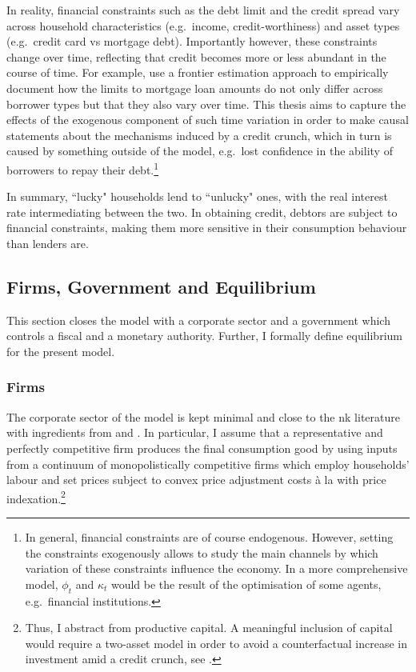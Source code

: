 \documentclass[a4paper,12pt]{article} %
\numberwithin{equation}{section} %
\numberwithin{figure}{section}
\numberwithin{table}{section}
\begin{document}
In reality, financial constraints such as the debt limit and the credit spread vary across household characteristics (e.g.~income, credit-worthiness) and asset types (e.g.~credit card vs mortgage debt). Importantly however, these constraints change over time, reflecting that credit becomes more or less abundant in the course of time. For example, \textcite{anenberg2018} use a frontier estimation approach to empirically document how the limits to mortgage loan amounts do not only differ across borrower types but that they also vary over time. This thesis aims to capture the effects of the exogenous component of such time variation in order to make causal statements about the mechanisms induced by a credit crunch, which in turn is caused by something outside of the model, e.g.~lost confidence in the ability of borrowers to repay their debt.\footnote{In general, financial constraints are of course endogenous. However, setting the constraints exogenously allows to study the main channels by which variation of these constraints influence the economy. In a more comprehensive model, $\phi_t$ and $\kappa_t$ would be the result of the optimisation of some agents, e.g.~financial institutions.}

In summary, ``lucky" households lend to ``unlucky" ones, with the real interest rate intermediating between the two. In obtaining credit, debtors are subject to financial constraints, making them more sensitive in their consumption behaviour than lenders are.

\subsection{Firms, Government and Equilibrium}
\label{sec:model-sectors}

This section closes the model with a corporate sector and a government which controls a fiscal and a monetary authority. Further, I formally define equilibrium for the present model.

\subsubsection{Firms}
\label{sec:model-firms}

The corporate sector of the model is kept minimal and close to the \Gls{nk} literature with ingredients from \textcite{gust2017wp} and \textcite{mckay2016}. In particular, I assume that a representative and perfectly competitive firm produces the final consumption good by using inputs from a continuum of monopolistically competitive firms which employ households' labour and set prices subject to convex price adjustment costs à la \textcite{rotemberg1982} with price indexation.\footnote{Thus, I abstract from productive capital. A meaningful inclusion of capital would require a two-asset model in order to avoid a counterfactual increase in investment amid a credit crunch, see \textcite{kv2018}.}
\end{document}
